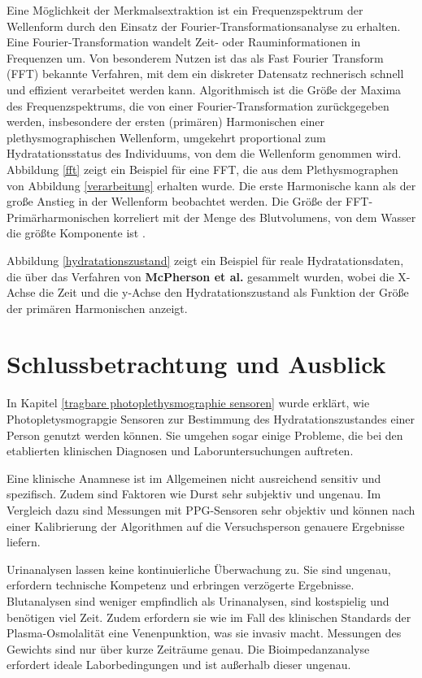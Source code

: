 \documentclass[10pt,a4paper,headinclude,twoside, plainheadsepline, open=right, numbers=noenddot, twocolumn]{article}
\begin{document}
Eine Möglichkeit der Merkmalsextraktion ist ein Frequenzspektrum der Wellenform durch den Einsatz der Fourier-Transformationsanalyse zu erhalten.
Eine Fourier-Transformation wandelt Zeit- oder Rauminformationen in Frequenzen um. 
Von besonderem Nutzen ist das als Fast Fourier Transform (FFT) bekannte Verfahren, mit dem ein diskreter Datensatz rechnerisch schnell und effizient verarbeitet werden kann. 
Algorithmisch ist die Größe der Maxima des Frequenzspektrums, die von einer Fourier-Transformation zurückgegeben werden, insbesondere der ersten (primären) Harmonischen einer plethysmographischen Wellenform, umgekehrt proportional zum Hydratationsstatus des Individuums, von dem die Wellenform genommen wird. 
Abbildung \ref{fft} zeigt ein Beispiel für eine FFT, die aus dem Plethysmographen von Abbildung \ref{verarbeitung} erhalten wurde. 
Die erste Harmonische kann als der große Anstieg in der Wellenform beobachtet werden.
Die Größe der FFT-Primärharmonischen korreliert mit der Menge des Blutvolumens, von dem Wasser die größte Komponente ist \cite{mcpherson2015systems}.


Abbildung \ref{hydratationszustand} zeigt ein Beispiel für reale Hydratationsdaten, die über das Verfahren von \textbf{McPherson et al.} gesammelt wurden, wobei die X-Achse die Zeit und die y-Achse den Hydratationszustand als Funktion der Größe der primären Harmonischen anzeigt.



\section{Schlussbetrachtung und Ausblick}
\label{schlussbetrachtung und ausblick}

In Kapitel \ref{tragbare photoplethysmographie sensoren} wurde erklärt, wie Photopletysmograpgie Sensoren zur Bestimmung des Hydratationszustandes einer Person genutzt werden können.
Sie umgehen sogar einige Probleme, die bei den etablierten klinischen Diagnosen und Laboruntersuchungen auftreten.

Eine klinische Anamnese ist im Allgemeinen nicht ausreichend sensitiv und spezifisch. 
Zudem sind Faktoren wie Durst sehr subjektiv und ungenau.
Im Vergleich dazu sind Messungen mit PPG-Sensoren sehr objektiv und können nach einer Kalibrierung der Algorithmen auf die Versuchsperson genauere Ergebnisse liefern.

Urinanalysen lassen keine kontinuierliche Überwachung zu.
Sie sind ungenau, erfordern technische Kompetenz und erbringen verzögerte Ergebnisse.
Blutanalysen sind weniger empfindlich als Urinanalysen, sind kostspielig und benötigen viel Zeit.
Zudem erfordern sie wie im Fall des klinischen Standards der Plasma-Osmolalität eine Venenpunktion, was sie invasiv macht.
Messungen des Gewichts sind nur über kurze Zeiträume genau.
Die Bioimpedanzanalyse erfordert ideale Laborbedingungen und ist außerhalb dieser ungenau.
\end{document}
